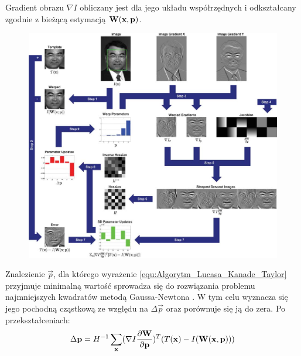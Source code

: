 Gradient obrazu $\nabla I$ obliczany jest dla jego układu współrzędnych i odkształcany zgodnie z bieżącą estymacją $\mathbf{W}(\mathbf{x}, \mathbf{p})$.

\begin{figure}[!htb]
	\begin{center}
		\includegraphics[width=16cm]{images/lucas_kanade_algorithm.png}
	\end{center}	
\label{fig:Algorytm_Lucasa_Kanade}
\end{figure}

Znalezienie $\vec{p}$, dla którego wyrażenie \ref{equ:Algorytm_Lucasa_Kanade_Taylor} przyjmuje minimalną wartość sprowadza się do rozwiązania problemu najmniejszych kwadratów metodą Gaussa-Newtona \cite{Baker2004}. W tym celu wyznacza się jego pochodną cząstkową ze względu na $\Delta \vec{p}$ oraz porównuje się ją do zera. Po przekształceniach:
\begin{equation}
\label{equ:Algorytm_Lucasa_Kanade_Gauss_Newton}
	\Delta \mathbf{p} = H^{-1} \sum\limits_{\mathbf{x}}(\nabla I \frac{\partial \mathbf{W}}{\partial \mathbf{p}})^T (T(\mathbf{x}) - I(\mathbf{W}(\mathbf{x}, \mathbf{p})))
\end{equation}

